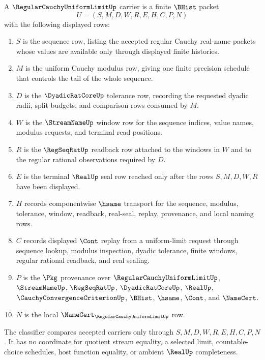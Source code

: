 \begin{definition}
\label{def:regular-cauchy-uniform-limit-carrier}
A $\RegularCauchyUniformLimitUp$ carrier is a finite $\BHist$ packet
$$
U=(S,M,D,W,R,E,H,C,P,N)
$$
with the following displayed rows:
\begin{enumerate}
\item $S$ is the sequence row, listing the accepted regular Cauchy real-name packets whose values are available only through displayed finite histories.
\item $M$ is the uniform Cauchy modulus row, giving one finite precision schedule that controls the tail of the whole sequence.
\item $D$ is the $\DyadicRatCoreUp$ tolerance row, recording the requested dyadic radii, split budgets, and comparison rows consumed by $M$.
\item $W$ is the $\StreamNameUp$ window row for the sequence indices, value names, modulus requests, and terminal read positions.
\item $R$ is the $\RegSeqRatUp$ readback row attached to the windows in $W$ and to the regular rational observations required by $D$.
\item $E$ is the terminal $\RealUp$ seal row reached only after the rows $S,M,D,W,R$ have been displayed.
\item $H$ records componentwise $\hsame$ transport for the sequence, modulus, tolerance, window, readback, real-seal, replay, provenance, and local naming rows.
\item $C$ records displayed $\Cont$ replay from a uniform-limit request through sequence lookup, modulus inspection, dyadic tolerance, finite windows, regular rational readback, and real sealing.
\item $P$ is the $\Pkg$ provenance over $\RegularCauchyUniformLimitUp$, $\StreamNameUp$, $\RegSeqRatUp$, $\DyadicRatCoreUp$, $\RealUp$, $\CauchyConvergenceCriterionUp$, $\BHist$, $\hsame$, $\Cont$, and $\NameCert$.
\item $N$ is the local $\NameCert_{\RegularCauchyUniformLimitUp}$ row.
\end{enumerate}
The classifier compares accepted carriers only through $S,M,D,W,R,E,H,C,P,N$. It has no coordinate for quotient stream equality, a selected limit, countable-choice schedules, host function equality, or ambient $\RealUp$ completeness.
\end{definition}

